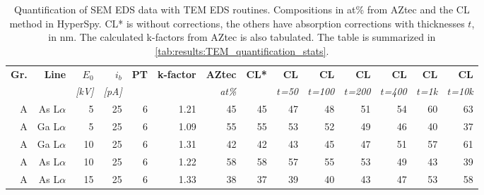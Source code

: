 \begin{table}[phtb]
    \begin{center}
        \caption{
            Quantification of SEM EDS data with TEM EDS routines.
            Compositions in at\% from AZtec and the CL method in HyperSpy. CL* is without corrections, the others have absorption corrections with thicknesses $t$, in nm.
            The calculated k-factors from AZtec is also tabulated. 
            The table is summarized in \cref{tab:results:TEM_quantification_stats}.
        }
        \label{tab:results:TEM_quantification}
        \begin{tabular}{rrrrrrrrrrrrrr}
            \hline
            \textbf{Gr.} & \textbf{Line} & \textbf{$E_0$} & \textbf{$i_b$} & \textbf{PT} & \textbf{k-factor} & \textbf{AZtec} & \textbf{CL*} & \textbf{CL}   & \textbf{CL}    & \textbf{CL}    & \textbf{CL}    & \textbf{CL}   & \textbf{CL}    \\
            \emph{}      & \emph{}       & \emph{[kV]}    & \emph{[pA]}    & \emph{}     & \emph{}           & \emph{at\%}    & \emph{}      & \emph{$t$=50} & \emph{$t$=100} & \emph{$t$=200} & \emph{$t$=400} & \emph{$t$=1k} & \emph{$t$=10k} \\
            \hline
            A            & As L$\alpha$  & 5              & 25             & 6           & 1.21              & 45             & 45           & 47            & 48             & 51             & 54             & 60            & 63             \\
            A            & Ga L$\alpha$  & 5              & 25             & 6           & 1.09              & 55             & 55           & 53            & 52             & 49             & 46             & 40            & 37             \\
            A            & Ga L$\alpha$  & 10             & 25             & 6           & 1.31              & 42             & 42           & 43            & 45             & 47             & 51             & 57            & 61             \\
            A            & As L$\alpha$  & 10             & 25             & 6           & 1.22              & 58             & 58           & 57            & 55             & 53             & 49             & 43            & 39             \\
            A            & As L$\alpha$  & 15             & 25             & 6           & 1.33              & 38             & 37           & 39            & 40             & 43             & 47             & 53            & 58             \\

\end{tabular}
\end{center}
\end{table}
